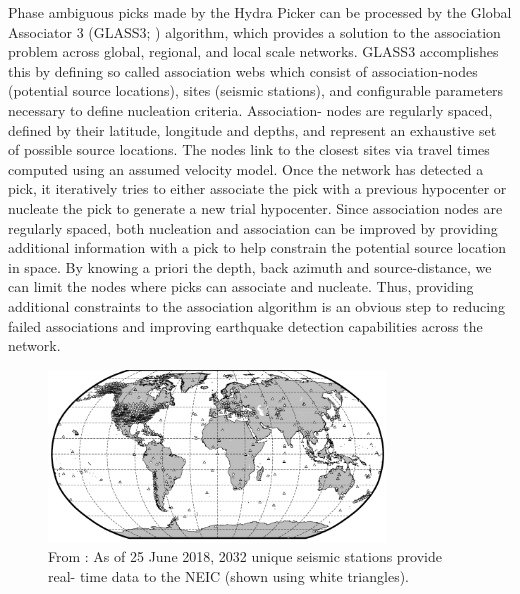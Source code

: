 \documentclass[12p]{article}
\begin{document}
Phase ambiguous picks made by the Hydra Picker can be processed by the Global Associator 3 (GLASS3; \citet{Yeck2019})
algorithm, which provides a solution to the association problem across global, regional, and local scale networks.
GLASS3 accomplishes this by defining so called association webs which consist of association-nodes (potential source
locations), sites (seismic stations), and configurable parameters necessary to define nucleation criteria. Association-
nodes are regularly spaced, defined by their latitude, longitude and depths, and represent an exhaustive set of
possible source locations. The nodes link to the closest sites via travel times computed using an assumed velocity
model. Once the network has detected a pick, it iteratively tries to either associate the pick with a previous
hypocenter or nucleate the pick to generate a new trial hypocenter. Since association nodes are regularly spaced, both
nucleation and association can be improved by providing additional information with a pick to help constrain the
potential source location in space. By knowing a priori the depth, back azimuth and source-distance, we can limit the
nodes where picks can associate and nucleate. Thus, providing additional constraints to the association algorithm is an
obvious step to reducing failed associations and improving earthquake detection capabilities across the network.

\begin{figure}[!htb]
  \center\includegraphics[width=0.8\textwidth]{figures/global_station_coverage.png}
  \caption{\label{fig:stations} From \cite{Yeck2019}: As of 25 June 2018, 2032 unique seismic stations provide real-
  time data to the NEIC (shown using white triangles).}
\end{figure}
\end{document}
